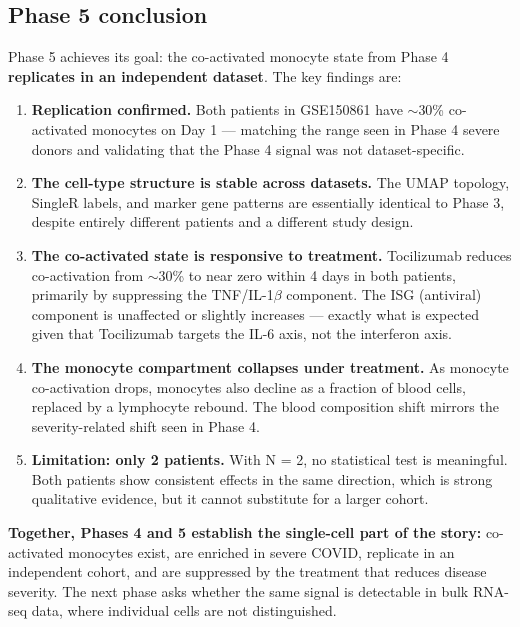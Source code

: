 \documentclass[11pt, a4paper]{article}
\begin{document}
\subsection{Phase 5 conclusion}

Phase 5 achieves its goal: the co-activated monocyte state from Phase 4
\textbf{replicates in an independent dataset}. The key findings are:

\begin{enumerate}[nosep]
  \item \textbf{Replication confirmed.}
        Both patients in GSE150861 have $\sim$30\% co-activated monocytes
        on Day 1 — matching the range seen in Phase 4 severe donors and
        validating that the Phase 4 signal was not dataset-specific.

  \item \textbf{The cell-type structure is stable across datasets.}
        The UMAP topology, SingleR labels, and marker gene patterns are
        essentially identical to Phase 3, despite entirely different
        patients and a different study design.

  \item \textbf{The co-activated state is responsive to treatment.}
        Tocilizumab reduces co-activation from $\sim$30\% to near zero
        within 4 days in both patients, primarily by suppressing the
        TNF/IL-1$\beta$ component. The ISG (antiviral) component is
        unaffected or slightly increases — exactly what is expected
        given that Tocilizumab targets the IL-6 axis, not the interferon
        axis.

  \item \textbf{The monocyte compartment collapses under treatment.}
        As monocyte co-activation drops, monocytes also decline as
        a fraction of blood cells, replaced by a lymphocyte rebound.
        The blood composition shift mirrors the severity-related
        shift seen in Phase 4.

  \item \textbf{Limitation: only 2 patients.}
        With N = 2, no statistical test is meaningful.
        Both patients show consistent effects in the same direction,
        which is strong qualitative evidence, but it cannot substitute
        for a larger cohort.
\end{enumerate}

\textbf{Together, Phases 4 and 5 establish the single-cell part of
the story:} co-activated monocytes exist, are enriched in severe
COVID, replicate in an independent cohort, and are suppressed by
the treatment that reduces disease severity.
The next phase asks whether the same signal is detectable in bulk
RNA-seq data, where individual cells are not distinguished.
\end{document}
